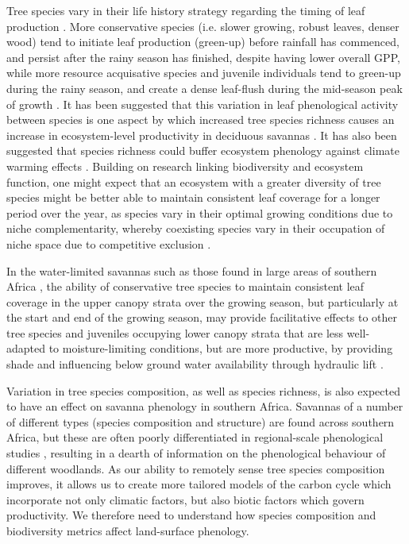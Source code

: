 \documentclass[11pt,a4paper]{article}
\begin{document}
Tree species vary in their life history strategy regarding the timing of leaf production \citep{Fenner1998, Cole2017, Medina1994}. More conservative species (i.e. slower growing, robust leaves, denser wood) tend to initiate leaf production (green-up) before rainfall has commenced, and persist after the rainy season has finished, despite having lower overall GPP, while more resource acquisative species and juvenile individuals tend to green-up during the rainy season, and create a dense leaf-flush during the mid-season peak of growth \citep{}. It has been suggested that this variation in leaf phenological activity between species is one aspect by which increased tree species richness causes an increase in ecosystem-level productivity in deciduous savannas \citep{}. It has also been suggested that species richness could buffer ecosystem phenology against climate warming effects \citep{Parmesan2007}. Building on research linking biodiversity and ecosystem function, one might expect that an ecosystem with a greater diversity of tree species might be better able to maintain consistent leaf coverage for a longer period over the year, as species vary in their optimal growing conditions due to niche complementarity, whereby coexisting species vary in their occupation of niche space due to competitive exclusion \citep{}.

In the water-limited savannas such as those found in large areas of southern Africa \citep{}, the ability of conservative tree species to maintain consistent leaf coverage in the upper canopy strata over the growing season, but particularly at the start and end of the growing season, may provide facilitative effects to other tree species and juveniles occupying lower canopy strata that are less well-adapted to moisture-limiting conditions, but are more productive, by providing shade and influencing below ground water availability through hydraulic lift \citep{}. 

Variation in tree species composition, as well as species richness, is also expected to have an effect on savanna phenology in southern Africa. Savannas of a number of different types (species composition and structure) are found across southern Africa, but these are often poorly differentiated in regional-scale phenological studies \citep{}, resulting in a dearth of information on the phenological behaviour of different woodlands. As our ability to remotely sense tree species composition improves, it allows us to create more tailored models of the carbon cycle which incorporate not only climatic factors, but also biotic factors which govern productivity. We therefore need to understand how species composition and biodiversity metrics affect land-surface phenology. 
\end{document}
